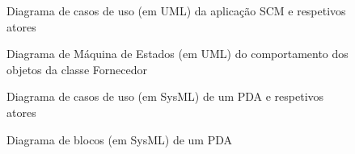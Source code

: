 \documentclass[12pt,a4paper]{article}
\begin{document}
\begin{landscape}
  \begin{figure}
    \centering
    
    \caption{Diagrama de casos de uso (em UML) da aplicação SCM e respetivos atores}
    \label{fig:uml1}
  \end{figure}
\end{landscape}

%     

\begin{landscape}
  \begin{figure}
    \centering
    
    \caption{Diagrama de Máquina de Estados (em UML) do comportamento dos objetos da classe Fornecedor}
    \label{fig:uml3}
  \end{figure}
\end{landscape}

\begin{landscape}
  \begin{figure}
    \centering
    
    \caption{Diagrama de casos de uso (em SysML) de um PDA e respetivos atores}
    \label{fig:sysml1}
  \end{figure}
\end{landscape}

\begin{landscape}
  \begin{figure}
    \centering
    
    \caption{Diagrama de blocos (em SysML) de um PDA}
    \label{fig:sysml2}
  \end{figure}
\end{landscape}

%     
\end{document}
